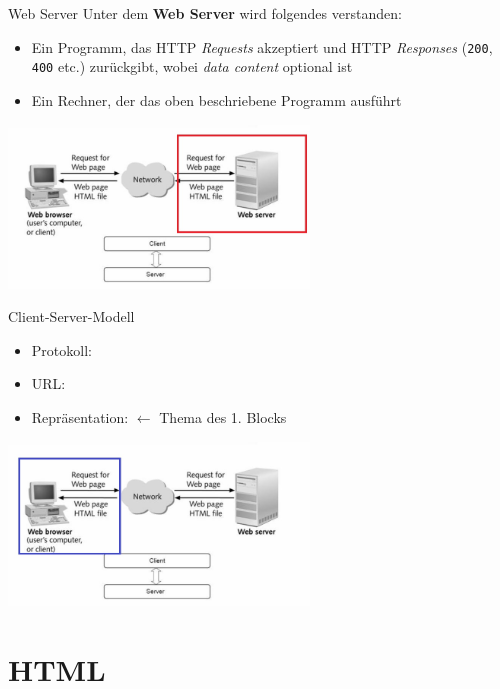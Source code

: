 \documentclass[12pt,xcolor={rgb}]{beamer}
\begin{document}
\begin{frame}{Web Server}
Unter dem \textbf{Web Server} wird folgendes verstanden:\\

\begin{itemize}
\item Ein Programm, das HTTP \textit{Requests} akzeptiert und  HTTP \textit{Responses} (\texttt{200}, \texttt{400} etc.) zurückgibt, wobei \textit{data content} optional ist
\item Ein Rechner, der das oben beschriebene Programm ausführt
\end{itemize}

\includegraphics[width=8cm]{imgs/introduction-to-web-architecture_server.jpg}

\end{frame}


\begin{frame}{Client-Server-Modell}
\begin{itemize}
\item Protokoll: \texttt{\color{red}{http}}
\item URL: \texttt{\color{red}{www.sportspar.de}}
\item Repräsentation: \texttt{\color{red}{HTML und CSS}} $\leftarrow$ Thema des 1. Blocks
\end{itemize}

\includegraphics[width=8cm]{imgs/introduction-to-web-architecture_frontend.jpg}
\end{frame}


\section{HTML}
\end{document}
